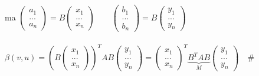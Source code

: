 \documentclass[12pt]{article}
\begin{document}
ma $\begin{pmatrix}
    a_1\\
    ...\\
    a_n
\end{pmatrix} = B\begin{pmatrix}
    x_1\\
    ...\\
    x_n
\end{pmatrix}\quad\quad \begin{pmatrix}
    b_1\\
    ...\\
    b_n
\end{pmatrix} = B\begin{pmatrix}
    y_1\\
    ...\\
    y_n
\end{pmatrix}$\\\\
$\beta(v,u)=(B\begin{pmatrix}
    x_1\\
    ...\\
    x_n
\end{pmatrix})^TAB\begin{pmatrix}
    y_1\\
    ...\\
    y_n
\end{pmatrix}=\begin{pmatrix}
    x_1\\
    ...\\
    x_n
\end{pmatrix}^T\underbrace{B^TAB}_{M}\begin{pmatrix}
    y_1\\
    ...\\
    y_n
\end{pmatrix}  \quad\#$
\end{document}
